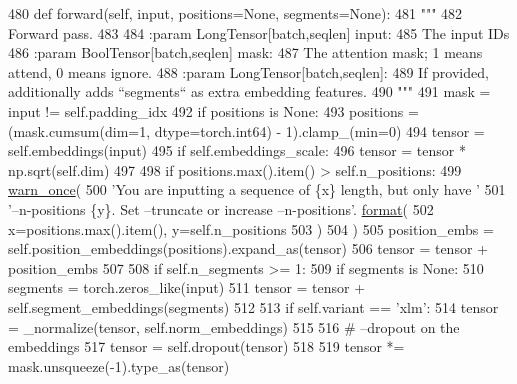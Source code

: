 \begin{DoxyCode}
480     \textcolor{keyword}{def }forward(self, input, positions=None, segments=None):
481         \textcolor{stringliteral}{"""}
482 \textcolor{stringliteral}{        Forward pass.}
483 \textcolor{stringliteral}{}
484 \textcolor{stringliteral}{        :param LongTensor[batch,seqlen] input:}
485 \textcolor{stringliteral}{            The input IDs}
486 \textcolor{stringliteral}{        :param BoolTensor[batch,seqlen] mask:}
487 \textcolor{stringliteral}{            The attention mask; 1 means attend, 0 means ignore.}
488 \textcolor{stringliteral}{        :param LongTensor[batch,seqlen]:}
489 \textcolor{stringliteral}{            If provided, additionally adds ``segments`` as extra embedding features.}
490 \textcolor{stringliteral}{        """}
491         mask = input != self.padding\_idx
492         \textcolor{keywordflow}{if} positions \textcolor{keywordflow}{is} \textcolor{keywordtype}{None}:
493             positions = (mask.cumsum(dim=1, dtype=torch.int64) - 1).clamp\_(min=0)
494         tensor = self.embeddings(input)
495         \textcolor{keywordflow}{if} self.embeddings\_scale:
496             tensor = tensor * np.sqrt(self.dim)
497 
498         \textcolor{keywordflow}{if} positions.max().item() > self.n\_positions:
499             \hyperlink{namespaceparlai_1_1utils_1_1misc_acf146e70ea7f6867969a7c2b545d4b4b}{warn\_once}(
500                 \textcolor{stringliteral}{'You are inputting a sequence of \{x\} length, but only have '}
501                 \textcolor{stringliteral}{'--n-positions \{y\}. Set --truncate or increase --n-positions'}.
      \hyperlink{namespaceparlai_1_1chat__service_1_1services_1_1messenger_1_1shared__utils_a32e2e2022b824fbaf80c747160b52a76}{format}(
502                     x=positions.max().item(), y=self.n\_positions
503                 )
504             )
505         position\_embs = self.position\_embeddings(positions).expand\_as(tensor)
506         tensor = tensor + position\_embs
507 
508         \textcolor{keywordflow}{if} self.n\_segments >= 1:
509             \textcolor{keywordflow}{if} segments \textcolor{keywordflow}{is} \textcolor{keywordtype}{None}:
510                 segments = torch.zeros\_like(input)
511             tensor = tensor + self.segment\_embeddings(segments)
512 
513         \textcolor{keywordflow}{if} self.variant == \textcolor{stringliteral}{'xlm'}:
514             tensor = \_normalize(tensor, self.norm\_embeddings)
515 
516         \textcolor{comment}{# --dropout on the embeddings}
517         tensor = self.dropout(tensor)
518 
519         tensor *= mask.unsqueeze(-1).type\_as(tensor)

\end{DoxyCode}
